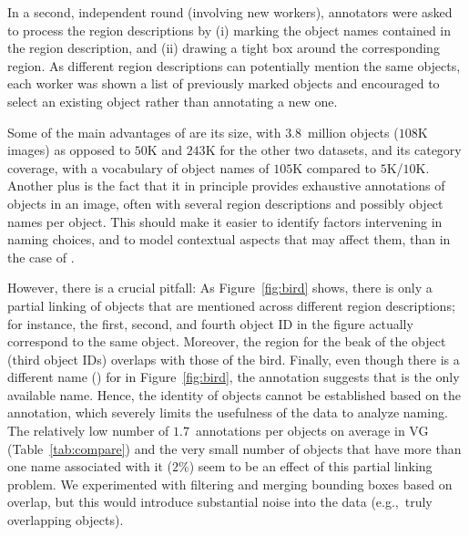 In a second, independent round (involving new workers), annotators were asked to process the region descriptions by (i) marking the object names contained in the region description, and (ii) drawing a tight box around the corresponding region. As different region descriptions can potentially mention the same objects, each worker was shown a list of previously marked objects and encouraged to select an existing object rather than annotating a new one.


Some of the main advantages of \vg are its size, with $3.8$~million objects ($108$K images) as opposed to $50$K and $243$K for the other two datasets, and its category coverage, with a vocabulary of object names of $105$K compared to $5$K/$10$K.
Another plus is the fact that it in principle provides exhaustive annotations of objects in an image, often with several region descriptions and possibly object names per object.
This should make it easier to identify factors intervening in naming choices, and to model contextual aspects that may affect them, than in the case of .

However, there is a crucial pitfall: As Figure~\ref{fig:bird} shows, there is only a partial linking of objects that are mentioned across different region descriptions; for instance, the first, second, and fourth object ID in the figure actually correspond to the same object.
Moreover, the region for the beak of the object (third object IDs) overlaps with those of the bird. 
Finally, even though there is a different name () for  in Figure~\ref{fig:bird}, the annotation suggests that  is the only available name. 
Hence, the identity of objects cannot be established based on the annotation, which severely limits the usefulness of the data to analyze naming.
The relatively low number of $1.7$~annotations per objects on average in VG (Table~\ref{tab:compare}) and the very small number of objects that have more than one name associated with it ($2$\%) seem to be an effect of this partial linking problem.
We experimented with filtering and merging bounding boxes based on overlap, but this would introduce substantial noise into the data (e.g.,~truly overlapping objects).

